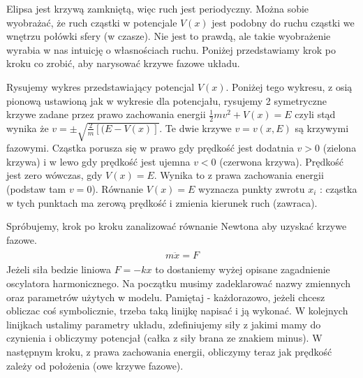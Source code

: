 \documentclass[a4paper,12pt,polish]{sphinxmanual}
\begin{document}
Elipsa jest krzywą zamkniętą, więc ruch jest periodyczny. Można sobie wyobrażać, że ruch cząstki w potencjale $V(x)$ jest  podobny do  ruchu cząstki we wnętrzu połówki sfery (w czasze). Nie jest to prawdą, ale takie wyobrażenie wyrabia w nas intuicję o własnościach ruchu. Poniżej przedstawiamy krok po kroku co zrobić, aby narysować krzywe fazowe układu.

Rysujemy wykres przedstawiający potencjal $V(x)$. Poniżej tego wykresu, z osią pionową ustawioną jak w wykresie dla potencjału, rysujemy 2 symetryczne krzywe zadane przez prawo zachowania energii $\frac{1}{2}m v^2 + V(x) = E$ czyli stąd wynika że $v = \pm \sqrt{\frac{2}{m}[(E-V(x)]}$. Te dwie krzywe $v=v(x, E)$ są krzywymi fazowymi.
Cząstka porusza się w prawo gdy prędkość jest dodatnia $v>0$ (zielona krzywa) i w lewo gdy prędkość jest ujemna $v<0$ (czerwona krzywa). Prędkość jest zero wówczas, gdy $V(x) = E$. Wynika to z prawa zachowania energii (podstaw tam $v=0$). Równanie $V(x) = E$ wyznacza punkty zwrotu $x_i$ : cząstka w tych punktach ma zerową prędkość i zmienia kierunek ruch (zawraca).

Spróbujemy, krok po kroku zanalizować równanie Newtona aby uzyskać krzywe fazowe.
\label{ch1/chI022:equation-eqn10}\begin{gather}
\begin{split}m \ddot{x} = F\end{split}\label{ch1/chI022-eqn10}
\end{gather}
Jeżeli siła bedzie liniowa $F=-kx$ to dostaniemy wyżej opisane zagadnienie oscylatora harmonicznego. Na początku musimy zadeklarować nazwy zmiennych oraz parametrów użytych w modelu. Pamiętaj - każdorazowo, jeżeli chcesz obliczac coś symbolicznie, trzeba taką linijkę napisać i ją wykonać. W kolejnych linijkach ustalimy parametry układu, zdefiniujemy siły z jakimi mamy do czynienia i obliczymy potencjał (całka z siły brana ze znakiem minus). W następnym kroku, z prawa zachowania energii, obliczymy teraz jak prędkość zależy od położenia (owe krzywe fazowe).
\end{document}
